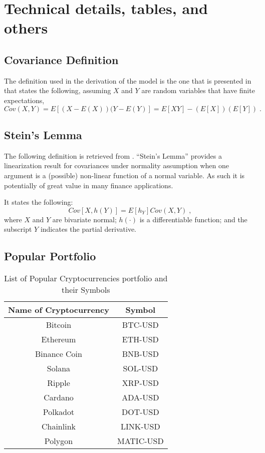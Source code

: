 
\chapter{Technical details, tables, and others}
\label{app_a}

\section{Covariance Definition}
\label{app: cov-def}
The definition used in the derivation of the model is the one that is presented in \parencite{Intro-prob-roussas} that states the following, assuming $X$ and $Y$ are random variables that have finite expectations,
\begin{equation}
	Cov(X,Y) = E\left[(X-E(X))(Y-E(Y)\right] = E\left[XY\right] - (E\left[X\right])(E\left[Y\right])\;.
\end{equation}

\section{Stein's Lemma}
\label{app: steins lemma}
The following definition is retrieved from \parencite{balvers2001}. ``Stein's Lemma'' provides a linearization result for covariances under normality assumption when one argument is a (possible) non-linear function of a normal variable. As such it is potentially of great value in many finance applications.

It states the following:
\begin{equation}
	Cov\left[X, h\left(Y\right)\right] = E\left[h_{Y}\right]Cov\left(X,Y\right)\;,
\end{equation}
where $X$ and $Y$ are bivariate normal; $h(\cdot)$ is a differentiable function; and the subscript $Y$ indicates the partial derivative.
\section{Popular Portfolio}
\begin{table}[h!]
	\centering
	\begin{tabular}{|c|c|}
		\hline
		\textbf{Name of Cryptocurrency} & \textbf{Symbol} \\ \hline
		Bitcoin & BTC-USD \\ \hline
		Ethereum & ETH-USD \\ \hline
		Binance Coin & BNB-USD \\ \hline
		Solana & SOL-USD \\ \hline
		Ripple & XRP-USD \\ \hline
		Cardano & ADA-USD \\ \hline
		Polkadot & DOT-USD \\ \hline
		Chainlink & LINK-USD \\ \hline
		Polygon & MATIC-USD \\ \hline
	\end{tabular}
	\caption{List of Popular Cryptocurrencies portfolio and their Symbols}
	\label{tab:cryptos}
\end{table}

